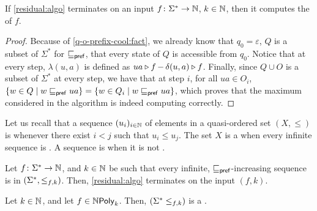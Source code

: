 \begin{lemma}
    \label{correct-residual:lemma}
    If \cref{residual:algo} terminates on 
    an input $f \colon \Sigma^* \to \Nat$, $k \in \Nat$,
    then it computes the  of $f$.
\end{lemma}
\begin{proof}
    Because of \cref{q-o-prefix-cool:fact},
    we already know that $q_0 = \varepsilon$,
    $Q$ is a  subset of $\Sigma^*$
    for $\prefleq$, 
    that every state of $Q$ is accessible from $q_0$.
    Notice that at every step,
    $\lambda(u,a)$ is defined as
    $\app{f}{ua} - \app{f}{\delta(u,a)}$.
    Finally, since $Q \cup O$ is a  subset of $\Sigma^*$
    at every step,
    we have that at step $i$,
    for all $ua \in O_i$,
    $\setof{w \in Q}{w \prefleq ua} = \setof{w \in Q_i}{ w \prefleq ua}$,
    which proves that the maximum considered in the algorithm
    is indeed computing correctly.
\end{proof}


\AP Let us recall that a sequence $\seqof{u_i}{i \in \Nat}$ of elements in a
quasi-ordered set $(X, \leq)$ is  whenever there exist $i < j$ such
that $u_i \leq u_j$. The set $X$ is a  when
every infinite sequence is . A sequence is 
when it is not .

\begin{lemma}
    \label{wqo-implies-termination:lemma}
    Let $f \colon \Sigma^* \to \Nat$, and $k \in \Nat$ be such that
    every infinite, $\prefleq$-increasing sequence is 
    in $(\Sigma^*, \resleq{f}{k})$.
    Then, \cref{residual:algo} terminates on the input $(f,k)$.
\end{lemma}

\begin{lemma}
    \label{n-poly-k-implies-wqo:lemma}
    Let $k \in \Nat$, and let $f \in \NPoly[k]$.
    Then, $(\Sigma^* \resleq{f}{k})$ is a .
\end{lemma}

